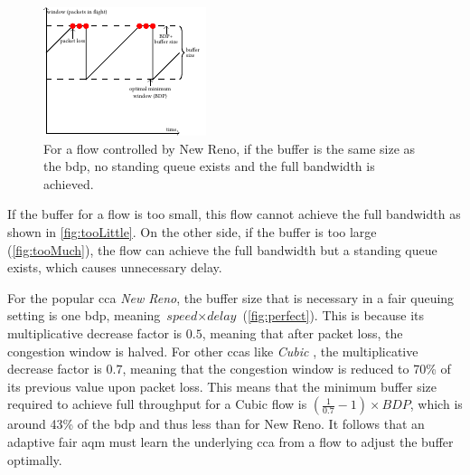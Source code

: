 \documentclass[conference]{IEEEtran}
\begin{document}
\begin{figure}[h]
\includegraphics[width=\columnwidth]{figures/cocoa_illustration_perfect.pdf}
\caption{For a flow controlled by New Reno, if the buffer is the same size as the \gls{bdp}, no standing queue exists and the full bandwidth is achieved.}
\label{fig:perfect}
\end{figure}

If the buffer for a flow is too small, this flow cannot achieve the full bandwidth as shown in \autoref{fig:tooLittle}. On the other side, if the buffer is too large (\autoref{fig:tooMuch}), the flow can achieve the full bandwidth but a standing queue exists, which causes unnecessary delay.  

For the popular \gls{cca} \textit{New Reno}, the buffer size that is necessary in a fair queuing setting is one \gls{bdp}, meaning $\textit{speed}\times\textit{delay}$ (\autoref{fig:perfect}). This is because its multiplicative decrease factor is $0.5$, meaning that after packet loss, the congestion window is halved. For other \glspl{cca} like \textit{Cubic} \cite{ha_cubic:_2008}, the multiplicative decrease factor is $0.7$, meaning that the congestion window is reduced to 70\% of its previous value upon packet loss. This means that the minimum buffer size required to achieve full throughput for a Cubic flow is $\left(\frac{1}{0.7}-1\right)\times \textit{BDP}$, which is around 43\% of the \gls{bdp} and thus less than for New Reno. It follows that an adaptive fair \gls{aqm} must learn the underlying \gls{cca} from a flow to adjust the buffer optimally. 
\end{document}

